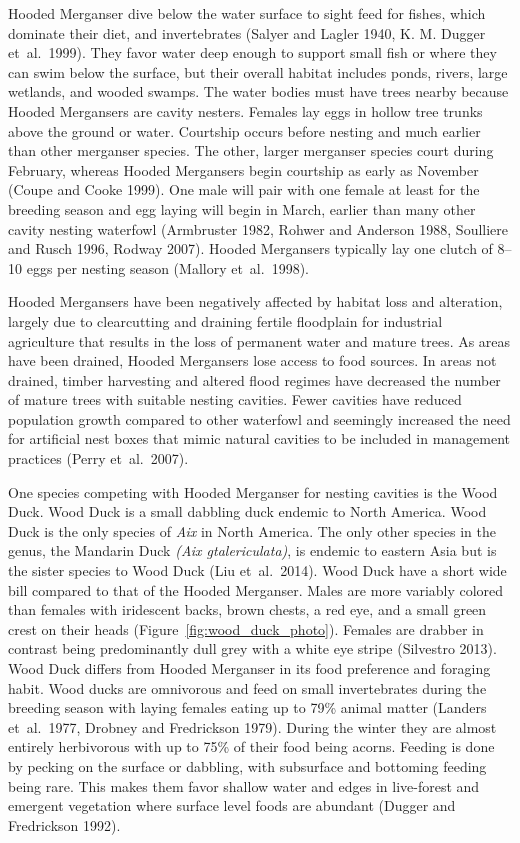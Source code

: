  


Hooded Merganser dive below the water surface to sight feed for fishes, which dominate their diet, and invertebrates (Salyer and Lagler 1940, K. M. Dugger et~al.~1999). They favor water deep enough to support small fish or where they can swim below the surface, but their overall habitat includes ponds, rivers, large wetlands, and wooded swamps. The water bodies must have trees nearby because Hooded Mergansers are cavity nesters. Females lay eggs in hollow tree trunks above the ground or water. Courtship occurs before nesting and much earlier than other merganser species. The other, larger merganser species court during February, whereas Hooded Mergansers begin courtship as early as November (Coupe and Cooke 1999). One male will pair with one female at least for the breeding season and egg laying will begin in March, earlier than many other cavity nesting waterfowl (Armbruster 1982, Rohwer and Anderson 1988, Soulliere and Rusch 1996, Rodway 2007). Hooded Mergansers typically lay one clutch of 8–10 eggs per nesting season (Mallory et~al.~1998).  

Hooded Mergansers have been negatively affected by habitat loss and alteration, largely due to clearcutting and draining fertile floodplain for industrial agriculture that results in the loss of permanent water and mature trees. As areas have been drained, Hooded Mergansers lose access to food sources. In areas not drained, timber harvesting and altered flood regimes have decreased the number of mature trees with suitable nesting cavities. Fewer cavities have reduced population growth compared to other waterfowl and seemingly increased the need for artificial nest boxes that mimic natural cavities to be included in management practices (Perry et~al.~2007).

One species competing with Hooded Merganser for nesting cavities is the Wood Duck.  Wood Duck is a small dabbling duck endemic to North America. Wood Duck is the only species of \textit{Aix} in North America. The only other species in the genus, the Mandarin Duck \textit{(Aix gtalericulata)}, is endemic to eastern Asia but is the sister species to Wood Duck (Liu et~al.~2014). Wood Duck have a short wide bill compared to that of the Hooded Merganser. Males are more variably colored than females with iridescent backs, brown chests, a red eye, and a small green crest on their heads (Figure~\ref{fig:wood_duck_photo}). Females are drabber in contrast being predominantly dull grey with a white eye stripe (Silvestro 2013). Wood Duck differs from Hooded Merganser in its food preference and foraging habit. Wood ducks are omnivorous and feed on small invertebrates during the breeding season with laying females eating up to 79\% animal matter (Landers et~al.~1977, Drobney and Fredrickson 1979). During the winter they are almost entirely herbivorous with up to 75\% of their food being acorns. Feeding is done by pecking on the surface or dabbling, with subsurface and bottoming feeding being rare. This makes them favor shallow water and edges in live-forest and emergent vegetation where surface level foods are abundant (Dugger and Fredrickson 1992).  

